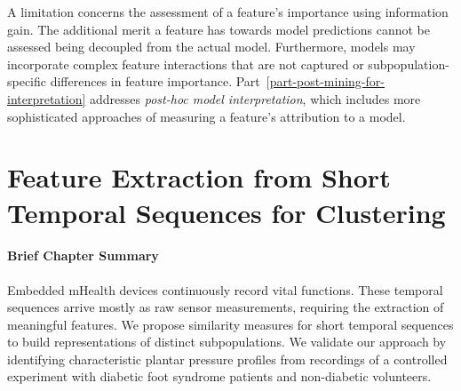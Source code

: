 \documentclass[
  oneside]{book}
\newenvironment{infobox}[1]
  {
  \begin{chapter-summary}
  }
  {
  \end{chapter-summary}
  }
\begin{document}
A limitation concerns the assessment of a feature's importance using information gain.
The additional merit a feature has towards model predictions cannot be assessed being decoupled from the actual model.
Furthermore, models may incorporate complex feature interactions that are not captured or subpopulation-specific differences in feature importance.
Part~\ref{part-post-mining-for-interpretation} addresses \emph{post-hoc model interpretation}, which includes more sophisticated approaches of measuring a feature's attribution to a model.

\hypertarget{diabfoot}{%
\chapter{Feature Extraction from Short Temporal Sequences for Clustering}\label{diabfoot}}

\begin{infobox}{tasks.pdf}

\hypertarget{brief-chapter-summary-4}{%
\subsubsection*{Brief Chapter Summary}\label{brief-chapter-summary-4}}

Embedded mHealth devices continuously record vital functions.
These temporal sequences arrive mostly as raw sensor measurements, requiring the extraction of meaningful features.
We propose similarity measures for short temporal sequences to build representations of distinct subpopulations.
We validate our approach by identifying characteristic plantar pressure profiles from recordings of a controlled experiment with diabetic foot syndrome patients and non-diabetic volunteers.

\end{infobox}
\end{document}
